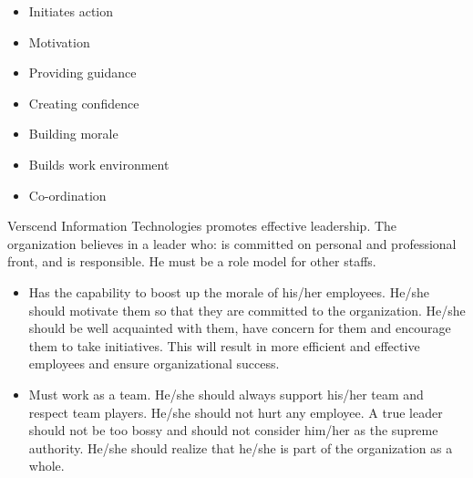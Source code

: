 \begin{itemize}
\item Initiates action
\item Motivation
\item Providing guidance
\item Creating confidence
\item Building morale
\item Builds work environment
\item Co-ordination
\end{itemize}
Verscend Information Technologies promotes effective leadership. The organization believes in a leader who:
is committed on personal and professional front, and is responsible. He must be a role model for other
staffs.
\begin{itemize}
\item
Has the capability to boost up the morale of his/her employees. He/she should motivate them so that
they are committed to the organization. He/she should be well acquainted with them, have concern for
them and encourage them to take initiatives. This will result in more efficient and effective employees
and ensure organizational success.
\item
Must work as a team. He/she should always support his/her team and respect team players. He/she
should not hurt any employee. A true leader should not be too bossy and should not consider him/her
as the supreme authority. He/she should realize that he/she is part of the organization as a whole.
\end{itemize}
\cleardoublepage
